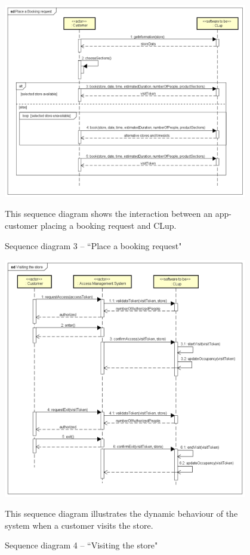 \documentclass[a4paper,oneside,11pt]{book}   %
\newcommand{\captionrasd}[2]{\caption{#1}\par\begin{center}\vspace{-.01\textheight}\small#2.\end{center}}
\begin{document}
    \begin{figure}[H]
        \centering
        \includegraphics[width=0.95\textwidth, keepaspectratio]{pictures/sequence_diagrams/place_booking_request}
        \captionrasd{Sequence diagram 3 -- ``Place a booking request"}{This sequence diagram shows the interaction between an app-customer placing a booking request and CLup}
        \label{figure:sequence_diagram_3_place_booking_request}
    \end{figure}
    
    \begin{figure}[H]
        \centering
        \includegraphics[width=0.95\textwidth, keepaspectratio]{pictures/sequence_diagrams/visiting_the_store}
        \captionrasd{Sequence diagram 4 -- ``Visiting the store"}{This sequence diagram illustrates the dynamic behaviour of the system when a customer visits the store}
        \label{figure:sequence_diagram_4_visiting_store_app}
    \end{figure}
    
\end{document}
